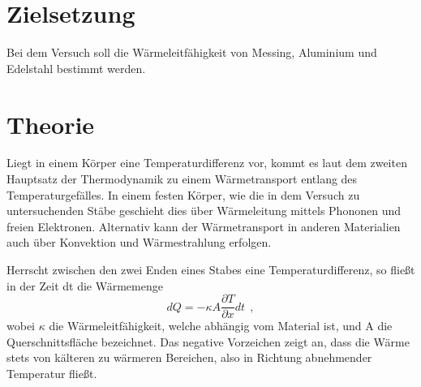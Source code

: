 \section{Zielsetzung}
Bei dem Versuch soll die Wärmeleitfähigkeit von Messing, Aluminium und Edelstahl
bestimmt werden.

\section{Theorie}
Liegt in einem Körper eine Temperaturdifferenz vor, kommt es laut dem zweiten Hauptsatz der Thermodynamik
zu einem Wärmetransport entlang des Temperaturgefälles. In einem festen Körper,
wie die in dem Versuch zu untersuchenden Stäbe geschieht dies über Wärmeleitung
mittels Phononen und freien Elektronen. Alternativ kann der Wärmetransport in anderen
Materialien auch über Konvektion und Wärmestrahlung erfolgen.

\noindent Herrscht zwischen den zwei Enden eines Stabes eine Temperaturdifferenz, so fließt in
der Zeit dt die Wärmemenge
\begin{equation}
  dQ= - \kappa A \frac{\partial T}{\partial x} dt \: \: ,
  \label{eqn:warm}
\end{equation}
wobei $ \kappa $ die Wärmeleitfähigkeit, welche abhängig vom Material ist, und A
die Querschnittsfläche bezeichnet.
Das negative Vorzeichen zeigt an, dass die Wärme stets von kälteren zu wärmeren
Bereichen, also in Richtung abnehmender Temperatur fließt.

